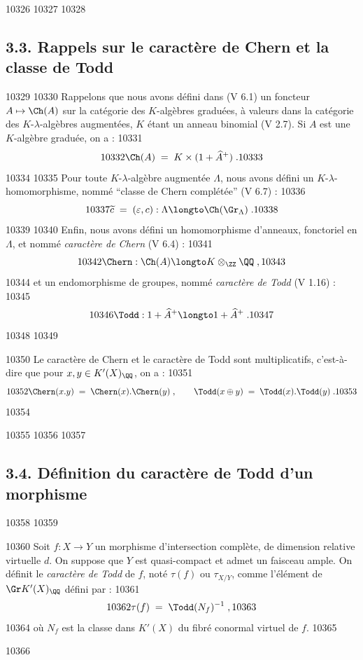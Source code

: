  10326	
 10327	
 10328	\subsection*{3.3. Rappels sur le caractère de Chern et la classe de Todd}
 10329	
 10330	Rappelons que nous avons défini dans (V 6.1) un foncteur $A \mapsto \Ch(A)$ sur la catégorie des $K$-algèbres graduées, à valeurs dans la catégorie des $K$-$\lambda$-algèbres augmentées, $K$ étant un anneau binomial (V 2.7). Si $A$ est une $K$-algèbre graduée, on a :
 10331	\[
 10332	\Ch(A) \; = \; K \times (1 + \widehat{A}^+)\; .
 10333	\]
 10334	
 10335	Pour toute $K$-$\lambda$-algèbre augmentée $\Lambda$, nous avons défini un $K$-$\lambda$-homomorphisme, nommé ``classe de Chern complétée'' (V 6.7) :
 10336	\[
 10337	\widetilde{c} \; = \; (\varepsilon, c) : \Lambda \longto \Ch(\Gr_{\Lambda})\; .
 10338	\]
 10339	
 10340	Enfin, nous avons défini un homomorphisme d'anneaux, fonctoriel en $\Lambda$, et nommé \emph{caractère de Chern} (V 6.4) :
 10341	\[
 10342	\Chern : \Ch(A) \longto K \otimes_{\ZZ} \QQ\; ,
 10343	\]
 10344	et un endomorphisme de groupes, nommé \emph{caractère de Todd} (V 1.16) :
 10345	\[
 10346	\Todd : 1 + \widehat{A}^+ \longto 1 + \widehat{A}^+\; .
 10347	\]
 10348	
 10349	\begin{proposition}[3.3]%
 10350	Le caractère de Chern et le caractère de Todd sont multiplicatifs, c'est-à-dire que pour $x, y \in K'(X)_{\QQ}$, on a :
 10351	\[
 10352	\Chern(x.y) \; = \; \Chern(x) . \Chern(y)\; , \qquad \Todd(x \oplus y) \; = \; \Todd(x) . \Todd(y)\; .
 10353	\]
 10354	\end{proposition}
 10355	
 10356	
 10357	\subsection*{3.4. Définition du caractère de Todd d'un morphisme}
 10358	
 10359	\begin{definition}[3.4]%
 10360	Soit $f : X \to Y$ un morphisme d'intersection complète, de dimension relative virtuelle $d$. On suppose que $Y$ est quasi-compact et admet un faisceau ample. On définit le \emph{caractère de Todd} de $f$, noté $\tau(f)$ ou $\tau_{X/Y}$, comme l'élément de $\Gr K'(X)_{\QQ}$ défini par :
 10361	\[
 10362	\tau(f) \; = \; \Todd(N_f)^{-1}\; ,
 10363	\]
 10364	où $N_f$ est la classe dans $K'(X)$ du fibré conormal virtuel de $f$.
 10365	\end{definition}
 10366	
